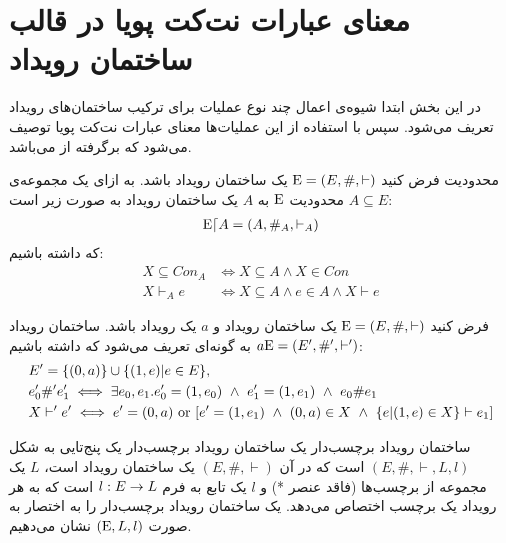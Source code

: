 \section{معنای عبارات نت‌کت پویا در قالب ساختمان رویداد}
در این بخش ابتدا شیوه‌ی اعمال چند نوع عملیات برای ترکیب ساختمان‌های رویداد تعریف می‌شود.
سپس با استفاده از این عملیات‌ها معنای عبارات نت‌کت پویا توصیف می‌شود که برگرفته از
\cite{es}
می‌باشد.

\begin{definition}{محدودیت}
    فرض کنید
    $\mathrm{E} = (E,\#,\vdash)$
    یک ساختمان رویداد باشد.
    به ازای یک مجموعه‌ی
    $A \subseteq E$
    محدودیت
    $\mathrm{E}$
    به
    $A$
    یک ساختمان رویداد به صورت زیر است:
    \begin{align*}
        \mathrm{E} \lceil A = (A,\#_A,\vdash_A)
    \end{align*}
    که داشته باشیم:
    \begin{align*}
        X \subseteq Con_A & \iff X \subseteq A \wedge X \in Con                 \\
        X \vdash_A e      & \iff X \subseteq A \wedge e \in A \wedge X \vdash e
    \end{align*}
\end{definition}

\begin{definition}
    فرض کنید
    $\mathrm{E} = (E,\#,\vdash)$
    یک ساختمان رویداد و
    $a$
    یک رویداد باشد.
    ساختمان رویداد
    $a\mathrm{E} = (E',\#',\vdash')$
    به گونه‌ای تعریف می‌شود که داشته باشیم:
    \begin{align*}
         & E' = \s{(0,a)} \cup \s{(1,e)|e \in E},                                                                       \\
         & e_0' \#' e_1'  \iff \exists e_0,e_1.e_0' = (1,e_0)
        \ \wedge \ e_1' = (1,e_1) \ \wedge \ e_0 \# e_1                                                                         \\
         & X \vdash' e' \iff e' = (0,a) \text{ or } [e' = (1,e_1) \ \wedge \ (0,a)\in X \ \wedge \ \s{e|(1,e)\in X} \vdash e_1]
    \end{align*}
\end{definition}

\begin{definition}{ساختمان رویداد برچسب‌دار}
    یک ساختمان رویداد برچسب‌دار
    یک پنج‌تایی به شکل
    $(E,\#,\vdash,L,l)$
    است که در آن
    $(E,\#,\vdash)$
    یک ساختمان رویداد است،
    $L$
    یک مجموعه از برچسب‌ها
    (فاقد عنصر *)
    و
    $l$
    یک تابع به فرم
    $l: E \rightarrow L$
    است که به هر رویداد یک برچسب اختصاص می‌دهد.
    یک ساختمان رویداد برچسب‌دار را به اختصار به صورت
    $(\mathrm{E},L,l)$
    نشان می‌دهیم.
\end{definition}

